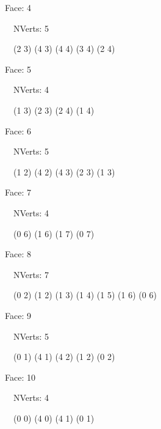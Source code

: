 \documentclass{article}
\begin{document}
    {\footnotesize

    Face: 4

    \   \    NVerts: 5

     \   \   (2 3) (4 3) (4 4) (3 4) (2 4)}

    {\footnotesize

    Face: 5

    \   \    NVerts: 4

     \   \   (1 3) (2 3) (2 4) (1 4)}

    {\footnotesize

    Face: 6

    \   \    NVerts: 5

     \   \   (1 2) (4 2) (4 3) (2 3) (1 3)}

    {\footnotesize

    Face: 7

    \   \    NVerts: 4

     \   \   (0 6) (1 6) (1 7) (0 7)}

    {\footnotesize

    Face: 8

    \   \    NVerts: 7

     \   \   (0 2) (1 2) (1 3) (1 4) (1 5) (1 6) (0 6)}

    {\footnotesize

    Face: 9

    \   \    NVerts: 5

     \   \   (0 1) (4 1) (4 2) (1 2) (0 2)}

    {\footnotesize

    Face: 10

    \   \    NVerts: 4

     \   \   (0 0) (4 0) (4 1) (0 1)}


     \newpage
\end{document}
